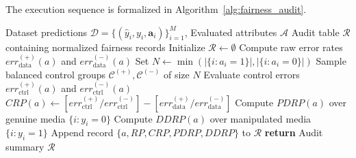\documentclass[journal]{IEEEtran}
\begin{document}
The execution sequence is formalized in Algorithm~\ref{alg:fairness_audit}.

\begin{algorithm}[t]
\caption{FairFake Demographic Fairness Auditing with Resampling}
\label{alg:fairness_audit}
\begin{algorithmic}[1]
\REQUIRE Dataset predictions $\mathcal{D} = \{(\hat{y}_i, y_i, \mathbf{a}_i)\}_{i=1}^M$, Evaluated attributes $\mathcal{A}$
\ENSURE Audit table $\mathcal{R}$ containing normalized fairness records
\STATE Initialize $\mathcal{R} \leftarrow \emptyset$
    \STATE Compute raw error rates $err_{\text{data}}^{(+)}(a)$ and $err_{\text{data}}^{(-)}(a)$
    \STATE Set $N \leftarrow \min(|\{i : a_i=1\}|, |\{i : a_i=0\}|)$
    \STATE Sample balanced control groups $\mathcal{C}^{(+)}, \mathcal{C}^{(-)}$ of size $N$
    \STATE Evaluate control errors $err_{\text{ctrl}}^{(+)}(a)$ and $err_{\text{ctrl}}^{(-)}(a)$
    \STATE $CRP(a) \leftarrow [err_{\text{ctrl}}^{(+)} / err_{\text{ctrl}}^{(-)}] - [err_{\text{data}}^{(+)} / err_{\text{data}}^{(-)}]$
    \STATE Compute $PDRP(a)$ over genuine media $\{i : y_i = 0\}$
    \STATE Compute $DDRP(a)$ over manipulated media $\{i : y_i = 1\}$
    \STATE Append record $\{a, RP, CRP, PDRP, DDRP\}$ to $\mathcal{R}$
\ENDFOR
\STATE \textbf{return} Audit summary $\mathcal{R}$
\end{algorithmic}
\end{algorithm}
\end{document}
